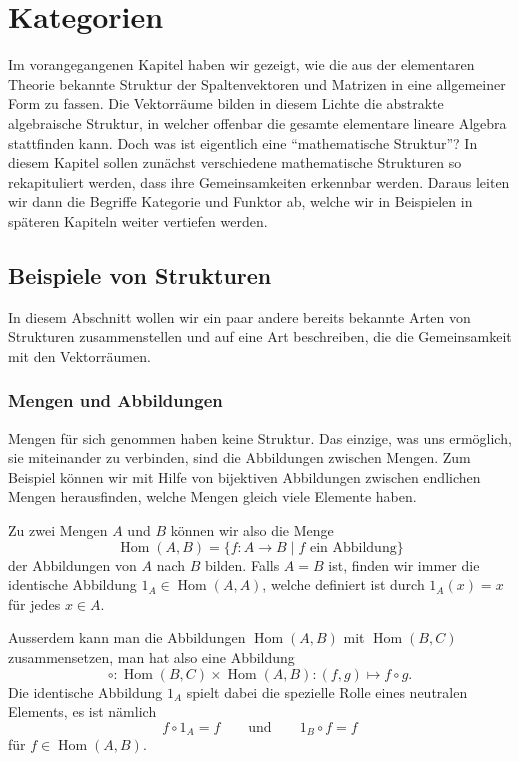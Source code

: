 %
%
%
\chapter{Kategorien%
\label{chapter:kategorien}}
Im vorangegangenen Kapitel haben wir gezeigt, wie die aus der
elementaren Theorie bekannte Struktur der Spaltenvektoren und
Matrizen in eine allgemeiner Form zu fassen.
Die Vektorräume bilden in diesem Lichte die abstrakte algebraische Struktur,
in welcher offenbar die gesamte elementare lineare Algebra stattfinden
kann.
Doch was ist eigentlich eine ``mathematische Struktur''?
In diesem Kapitel sollen zunächst verschiedene mathematische Strukturen
so rekapituliert werden, dass ihre Gemeinsamkeiten erkennbar werden.
Daraus leiten wir dann die Begriffe Kategorie und Funktor ab, welche
wir in Beispielen in späteren Kapiteln weiter vertiefen werden.

\section{Beispiele von Strukturen}
In diesem Abschnitt wollen wir ein paar andere bereits bekannte
Arten von Strukturen zusammenstellen und auf eine Art beschreiben,
die die Gemeinsamkeit mit den Vektorräumen.

\subsection{Mengen und Abbildungen}
Mengen für sich genommen haben keine Struktur.
Das einzige, was uns ermöglich, sie miteinander zu verbinden, sind die
Abbildungen zwischen Mengen.
Zum Beispiel können wir mit Hilfe von bijektiven Abbildungen zwischen
endlichen Mengen herausfinden, welche Mengen gleich viele Elemente haben.

Zu zwei Mengen $A$ und $B$ können wir also die Menge 
\[
\operatorname{Hom}(A,B)
=
\{ f\colon A\to B\;|\; \text{$f$ ein Abbildung}\}
\]
der Abbildungen von $A$ nach $B$ bilden.
Falls $A=B$ ist, finden wir immer die identische Abbildung
$1_{A}\in \operatorname{Hom}(A,A)$, welche definiert ist durch
$1_A(x)=x$
für jedes $x\in A$.

Ausserdem kann man die Abbildungen
$\operatorname{Hom}(A,B)$
mit
$\operatorname{Hom}(B,C)$
zusammensetzen, man hat also eine Abbildung
\[
\circ
\colon
\operatorname{Hom}(B,C)
\times
\operatorname{Hom}(A,B)
:
(f,g)
\mapsto
f\circ g.
\]
Die identische Abbildung $1_A$ spielt dabei die spezielle Rolle eines
neutralen Elements,
es ist nämlich
\[
f\circ 1_A
=
f
\qquad\text{und}\qquad
1_B \circ f = f
\]
für $f\in\operatorname{Hom}(A,B)$.

